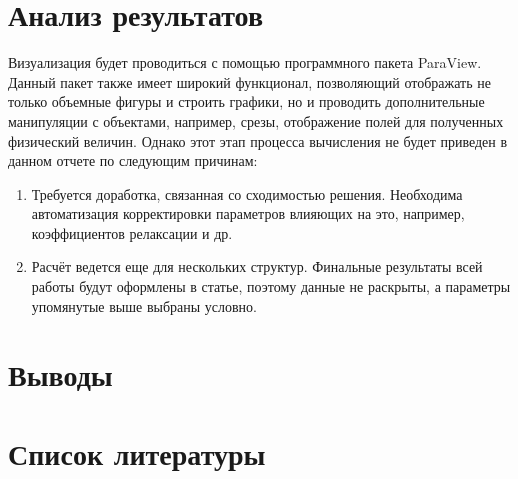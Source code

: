 \documentclass[a4paper, 12pt]{article}
\begin{document}
    \section{Анализ результатов}
    Визуализация будет проводиться с помощью программного пакета ParaView. Данный пакет также имеет широкий функционал, позволяющий отображать не только объемные фигуры и строить графики, но и проводить дополнительные манипуляции с объектами, например, срезы, отображение полей для полученных физический величин.
    Однако этот этап процесса вычисления не будет приведен в данном отчете по следующим причинам:
    \begin{enumerate}
        \item Требуется доработка, связанная со сходимостью решения. Необходима автоматизация корректировки параметров влияющих на это, например, коэффициентов релаксации и др.
        \item Расчёт ведется еще для нескольких структур. Финальные результаты всей работы будут оформлены в статье, поэтому данные не раскрыты, а параметры упомянутые выше выбраны условно.
    \end{enumerate}
    \newpage

    \section{Выводы}
    \newpage

    \section{Список литературы}
\end{document}
